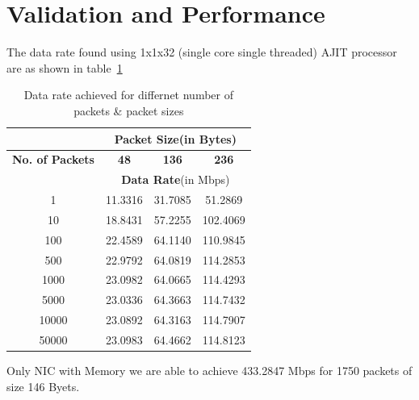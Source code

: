 \documentclass[a4paper,11pt, final]{report}
\begin{document}
	\section{Validation and Performance}
		The data rate found using 1x1x32 (single core single threaded) AJIT processor are as shown in table~\ref{table_dataRate}
		\begin{table}[h!]
			\caption{Data rate achieved for differnet number of packets \& packet sizes}
			\begin{center}
				\begin{tabular}{|c|c|c|c|}
					\hline
					& \multicolumn{3}{c|}{\textbf{Packet Size}(in Bytes)}\\
					\hline
					\textbf{No. of Packets}& \textbf{48}			& \textbf{136}			& \textbf{236} 	  \\
					\hline
					&  \multicolumn{3}{c|}{\textbf{Data Rate}(in Mbps)}\\	
					\hline
					1			& 11.3316		  	& 31.7085			& 51.2869 \\
					\hline
					10			& 18.8431		  	& 57.2255			& 102.4069\\
					\hline
					100			& 22.4589		  	& 64.1140			& 110.9845\\
					\hline
					500			& 22.9792		  	& 64.0819			& 114.2853\\
					\hline
					1000			& 23.0982			& 64.0665			& 114.4293\\
					\hline
					5000			& 23.0336			& 64.3663			& 114.7432\\
					\hline
					10000			& 23.0892			& 64.3163			& 114.7907\\
					\hline
					50000			& 23.0983			& 64.4662			& 114.8123\\
					\hline
				\end{tabular}
				\label{table_dataRate}
			\end{center}
		\end{table}
	
	Only NIC with Memory we are able to achieve 433.2847 Mbps for 1750 packets of size 146 Byets.

\end{document}

